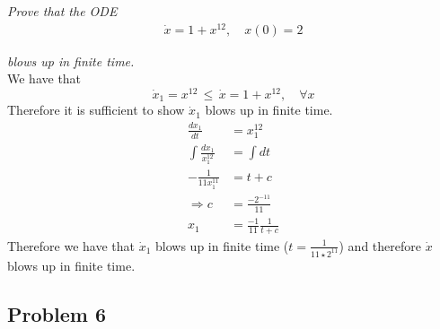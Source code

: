 \documentclass[12pt]{article}
\theoremstyle{remark}
\begin{document}
\textit{Prove that the ODE}
\begin{align}
	\dot{x} = 1 + x^{12}, \quad x(0) = 2
\end{align}

\textit{blows up in finite time.} \\

We have that  
$$  \dot{x}_1 = x^{12} \, \leq \, \dot{x} = 1 + x^{12}, \quad \forall x $$
Therefore it is sufficient to show $\dot{x}_1$ blows up in finite time.
\begin{align*}
	\frac{dx_1}{dt} & = x_1^{12} \\
	\int\frac{dx_1}{x_1^{12}} & = \int dt \\
	-\frac{1}{11x_1^{11}} & = t + c \\
	\Rightarrow c & = \frac{-2^{-11}}{11} \\
	x_1 & = \frac{-1}{11}\frac{1}{t+c} 
\end{align*}
 Therefore we have that $\dot{x}_1$ blows up in finite time ($t = \frac{1}{11\star 2^{11}}$) and therefore $\dot{x}$ blows up in finite time. 

\newpage

\subsection*{Problem 6}
\end{document}
